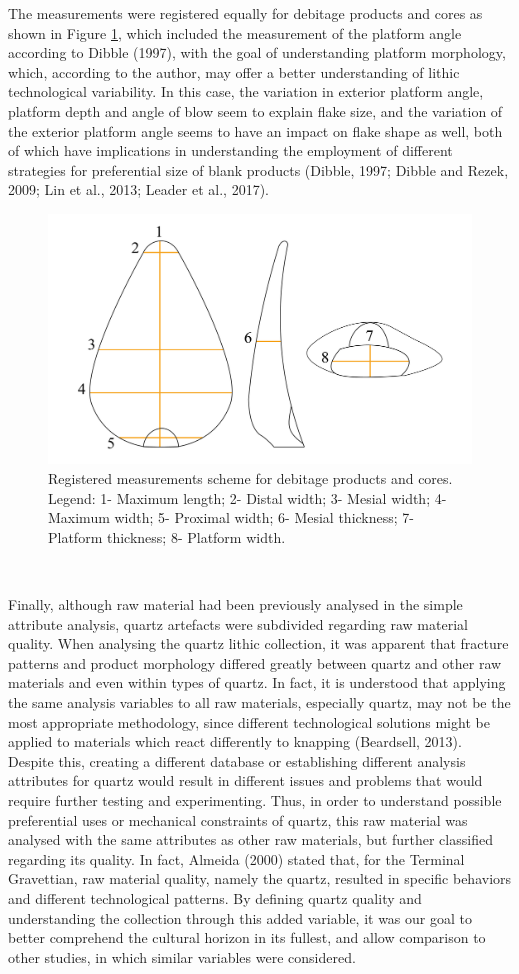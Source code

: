 \documentclass[12pt,twoside]{reedthesis}
\begin{document}
The measurements were registered equally for debitage products and cores as shown in Figure \ref{fig:metric}, which included the measurement of the platform angle according to Dibble (1997), with the goal of understanding platform morphology, which, according to the author, may offer a better understanding of lithic technological variability. In this case, the variation in exterior platform angle, platform depth and angle of blow seem to explain flake size, and the variation of the exterior platform angle seems to have an impact on flake shape as well, both of which have implications in understanding the employment of different strategies for preferential size of blank products (Dibble, 1997; Dibble and Rezek, 2009; Lin et al., 2013; Leader et al., 2017).
\begin{figure}

{\centering \includegraphics[width=0.6\linewidth]{figure/Metrics-01} 

}

\caption{Registered measurements scheme for debitage products and cores. Legend: 1- Maximum length; 2- Distal width; 3- Mesial width; 4- Maximum width; 5- Proximal width; 6- Mesial thickness; 7- Platform thickness; 8- Platform width.}\label{fig:metric}
\end{figure}
~

Finally, although raw material had been previously analysed in the simple attribute analysis, quartz artefacts were subdivided regarding raw material quality. When analysing the quartz lithic collection, it was apparent that fracture patterns and product morphology differed greatly between quartz and other raw materials and even within types of quartz. In fact, it is understood that applying the same analysis variables to all raw materials, especially quartz, may not be the most appropriate methodology, since different technological solutions might be applied to materials which react differently to knapping (Beardsell, 2013). Despite this, creating a different database or establishing different analysis attributes for quartz would result in different issues and problems that would require further testing and experimenting. Thus, in order to understand possible preferential uses or mechanical constraints of quartz, this raw material was analysed with the same attributes as other raw materials, but further classified regarding its quality. In fact, Almeida (2000) stated that, for the Terminal Gravettian, raw material quality, namely the quartz, resulted in specific behaviors and different technological patterns. By defining quartz quality and understanding the collection through this added variable, it was our goal to better comprehend the cultural horizon in its fullest, and allow comparison to other studies, in which similar variables were considered.
\end{document}
